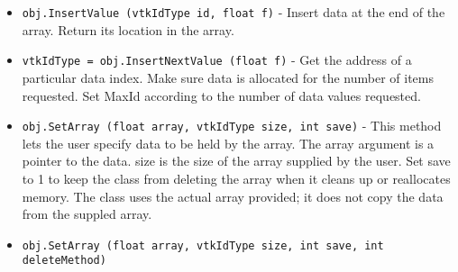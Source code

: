 \begin{itemize}
\item  \verb|obj.InsertValue (vtkIdType id, float f)| -  Insert data at the end of the array. Return its location in the array.

\item  \verb|vtkIdType = obj.InsertNextValue (float f)| -  Get the address of a particular data index. Make sure data is allocated
 for the number of items requested. Set MaxId according to the number of
 data values requested.

\item  \verb|obj.SetArray (float array, vtkIdType size, int save)| -  This method lets the user specify data to be held by the array.  The
 array argument is a pointer to the data.  size is the size of
 the array supplied by the user.  Set save to 1 to keep the class
 from deleting the array when it cleans up or reallocates memory.
 The class uses the actual array provided; it does not copy the data
 from the suppled array. 

\item  \verb|obj.SetArray (float array, vtkIdType size, int save, int deleteMethod)|

\end{itemize}
